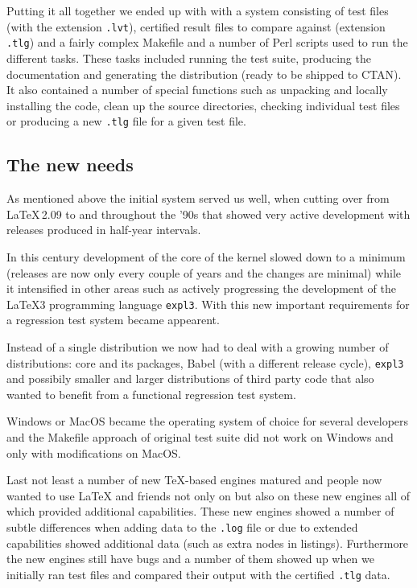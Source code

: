 \documentclass[a4paper]{ltugboat}
\begin{document}
Putting it all together we ended up with with a system consisting of
test files (with the extension \texttt{.lvt}), certified result files
to compare against (extension \texttt{.tlg}) and a fairly complex
Makefile and a number of Perl scripts used to run the different
tasks. These tasks included running the test suite, producing the
documentation and generating the distribution (ready to be shipped to
CTAN). It also contained a number of special functions such as
unpacking and locally installing the code, clean up the source
directories, checking individual test files or producing a new
\texttt{.tlg} file for a given test file.

\subsection{The new needs}

As mentioned above the initial system served us well, when cutting
over from \LaTeX\,2.09 to \LaTeXe{} and throughout the '90s that
showed very active \LaTeXe{} development with releases produced in
half-year intervals.

In this century development of the core of the \LaTeXe{} kernel slowed
down to a minimum (releases are now only every couple of years and the
changes are minimal) while it intensified in other areas such as
actively progressing the development of the \LaTeX3 programming
language \texttt{expl3}. With this new important requirements for a
regression test system became appearent.

Instead of a single distribution we now had to deal with a growing
number of distributions: core \LaTeXe{} and its packages, Babel (with
a different release cycle), \texttt{expl3} and possibily smaller and
larger distributions of third party code that also wanted to benefit
from a functional regression test system.

Windows or MacOS became the operating system of choice for several
developers and the Makefile approach of original test suite did not
work on Windows and only with modifications on MacOS.

Last not least a number of new \TeX-based engines matured and people
now wanted to use \LaTeX{} and friends not only on \pdfTeX{} but also
on these new engines all of which provided additional capabilities.
These new engines showed a number of subtle differences when adding
data to the \texttt{.log} file or due to extended capabilities showed
additional data (such as extra nodes in listings). Furthermore the new
engines still have bugs and a number of them showed up when we
initially ran test files and compared their output with the certified
\texttt{.tlg} data.
\end{document}
